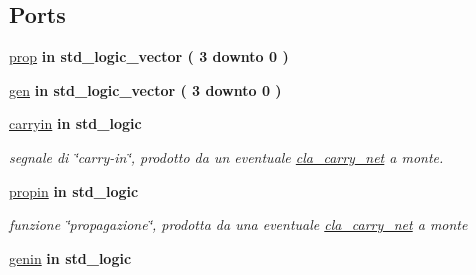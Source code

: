 \subsection*{Ports}
 \begin{DoxyCompactItemize}
\item 
\hyperlink{group___carry_network_gac1f84cd3374a5a4d2ee2669ebdadafe8}{prop}  {\bfseries {\bfseries \textcolor{vhdlchar}{in}\textcolor{vhdlchar}{ }}} {\bfseries \textcolor{vhdlchar}{std\+\_\+logic\+\_\+vector}\textcolor{vhdlchar}{ }\textcolor{vhdlchar}{(}\textcolor{vhdlchar}{ }\textcolor{vhdlchar}{ } \textcolor{vhdldigit}{3} \textcolor{vhdlchar}{ }\textcolor{vhdlchar}{downto}\textcolor{vhdlchar}{ }\textcolor{vhdlchar}{ } \textcolor{vhdldigit}{0} \textcolor{vhdlchar}{ }\textcolor{vhdlchar}{)}\textcolor{vhdlchar}{ }} 
\item 
\hyperlink{group___carry_network_ga1ff97daaf4e03defc21748593cacfaa7}{gen}  {\bfseries {\bfseries \textcolor{vhdlchar}{in}\textcolor{vhdlchar}{ }}} {\bfseries \textcolor{vhdlchar}{std\+\_\+logic\+\_\+vector}\textcolor{vhdlchar}{ }\textcolor{vhdlchar}{(}\textcolor{vhdlchar}{ }\textcolor{vhdlchar}{ } \textcolor{vhdldigit}{3} \textcolor{vhdlchar}{ }\textcolor{vhdlchar}{downto}\textcolor{vhdlchar}{ }\textcolor{vhdlchar}{ } \textcolor{vhdldigit}{0} \textcolor{vhdlchar}{ }\textcolor{vhdlchar}{)}\textcolor{vhdlchar}{ }} 
\item 
\hyperlink{group___carry_network_gaa556a73dc4a4de1a0d662b25adbcbe33}{carryin}  {\bfseries {\bfseries \textcolor{vhdlchar}{in}\textcolor{vhdlchar}{ }}} {\bfseries \textcolor{vhdlchar}{std\+\_\+logic}\textcolor{vhdlchar}{ }} 
\begin{DoxyCompactList}\small\item\em segnale di \char`\"{}carry-\/in\char`\"{}, prodotto da un eventuale \hyperlink{classcla__carry__net}{cla\+\_\+carry\+\_\+net} a monte. \end{DoxyCompactList}\item 
\hyperlink{group___carry_network_ga422e8e7ee01fc7ac7b7390cd2ad8c87b}{propin}  {\bfseries {\bfseries \textcolor{vhdlchar}{in}\textcolor{vhdlchar}{ }}} {\bfseries \textcolor{vhdlchar}{std\+\_\+logic}\textcolor{vhdlchar}{ }} 
\begin{DoxyCompactList}\small\item\em funzione \char`\"{}propagazione\char`\"{}, prodotta da una eventuale \hyperlink{classcla__carry__net}{cla\+\_\+carry\+\_\+net} a monte \end{DoxyCompactList}\item 
\hyperlink{group___carry_network_ga0a46d5193cb73eb993bc5d4f69741d0a}{genin}  {\bfseries {\bfseries \textcolor{vhdlchar}{in}\textcolor{vhdlchar}{ }}} {\bfseries \textcolor{vhdlchar}{std\+\_\+logic}\textcolor{vhdlchar}{ }} 

\end{DoxyCompactItemize}
